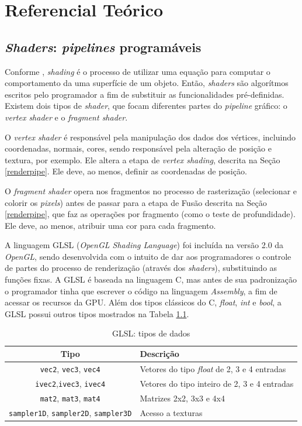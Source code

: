 \chapter[Referencial Teórico]{Referencial Teórico}
\label{refteorico}

\section{\textit{Shaders}: \textit{pipelines} programáveis}

	Conforme \cite{realtime}, \textit{shading} é o processo de utilizar uma equação para computar o comportamento da uma superfície de um objeto. Então, \textit{shaders} são algorítmos escritos pelo programador a fim de substituir as funcionalidades pré-definidas. Existem dois tipos de \textit{shader}, que focam diferentes partes do \textit{pipeline} gráfico: o \textit{vertex shader} e o \textit{fragment shader}. 

	O   \textit{vertex shader} é responsável pela manipulação dos dados dos vértices, incluindo coordenadas, normais, cores, sendo responsável pela alteração de posição e textura, por exemplo. Ele altera a etapa de \textit{vertex shading}, descrita na Seção \ref{renderpipe}. Ele deve, ao menos, definir as coordenadas de posição. 

	O \textit{fragment shader} opera nos fragmentos no processo de rasterização (selecionar e colorir os \textit{pixels}) antes de passar para a etapa de Fusão descrita na Seção \ref{renderpipe}, que faz as operações por fragmento (como o teste de profundidade). Ele deve, ao menos, atribuir uma cor para cada fragmento. 

	A linguagem GLSL (\textit{OpenGL Shading Language}) foi incluída na versão 2.0 da  \textit{OpenGL}, sendo desenvolvida com o intuito de dar aos programadores o controle de partes do processo de renderização (através dos \textit{shaders}), substituindo as funções fixas. A GLSL é baseada na linguagem C, mas antes de sua padronização o programador tinha que escrever o código na linguagem \textit{Assembly}, a fim de acessar os recursos da GPU. Além dos tipos clássicos do C, \textit{float}, \textit{int} e \textit{bool}, a GLSL possui outros tipos mostrados na Tabela \ref{tiposglsl}.

\begin{table}[h]
	\centering	
	\begin{tabularx}{0.9\textwidth}{cX}
		\toprule
		\textbf{Tipo} & \textbf{Descrição}  \\
		\midrule
		\texttt{vec2}, \texttt{vec3}, \texttt{vec4} & Vetores do tipo \textit{float} de 2, 3 e 4 entradas \\
		\texttt{ivec2},\texttt{ivec3}, \texttt{ivec4} & Vetores do tipo inteiro de 2, 3 e 4 entradas \\
		\texttt{mat2}, \texttt{mat3}, \texttt{mat4} & Matrizes 2x2, 3x3 e 4x4 \\
		\texttt{sampler1D}, \texttt{sampler2D}, \texttt{sampler3D} & Acesso a texturas \\
		\bottomrule
	\end{tabularx}
	\caption{ GLSL: tipos de dados}
	\label{tiposglsl}
\end{table}


